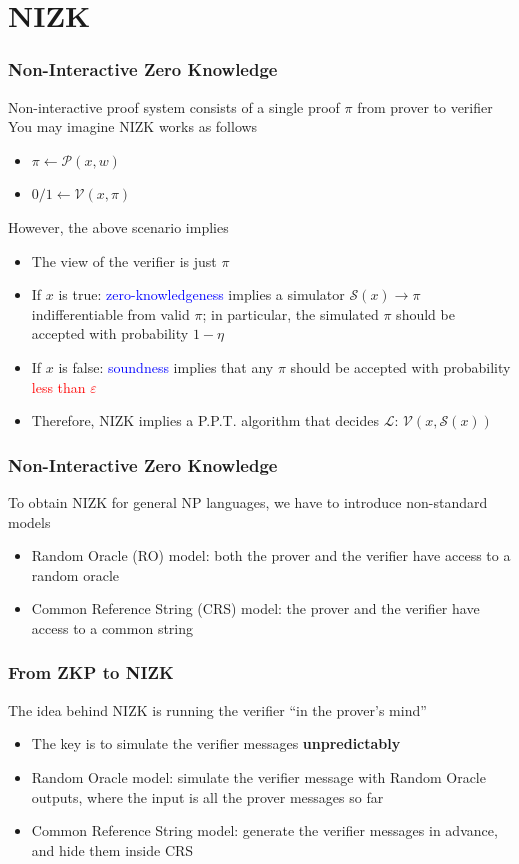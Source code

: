 \documentclass{beamer}
\newcommand{\blue}[1]{\textcolor{blue}{#1}}
\newcommand{\dgreen}[1]{\textcolor{dgreen}{#1}}
\newcommand{\red}[1]{\textcolor{red}{#1}}
\begin{document}
\section{NIZK}

\frame
{
  \frametitle{Non-Interactive Zero Knowledge}
  \onslide<+-> Non-interactive proof system consists of a single proof $\pi$ from prover to verifier\\\vspace{0.3cm}
  \onslide<+-> You may imagine NIZK works as follows
  \begin{itemize}
    \item<+-> $\pi\leftarrow\mathcal{P}(x,w)$
    \item<+-> $0/1\leftarrow\mathcal{V}(x,\pi)$
  \end{itemize}
  \onslide<+-> However, the above scenario implies
  \begin{itemize}
    \item<+-> The view of the verifier is just $\pi$
    \item<+-> If $x$ is true: \blue{zero-knowledgeness} implies a simulator $\mathcal{S}(x)\to\pi$ \dgreen{indifferentiable from valid $\pi$}; in particular, the simulated $\pi$ \dgreen{should be accepted} with probability $1-\eta$
    \item<+-> If $x$ is false: \blue{soundness} implies that any $\pi$ should be accepted with probability \red{less than $\varepsilon$}
    \item<+-> Therefore, NIZK implies a P.P.T. algorithm that decides $\mathcal{L}$: $\mathcal{V}(x,\mathcal{S}(x))$
  \end{itemize}
}


\frame
{
  \frametitle{Non-Interactive Zero Knowledge}
  \onslide<+-> To obtain NIZK for general NP languages, we have to introduce non-standard models
  \begin{itemize}
    \item<+-> Random Oracle (RO) model: both the prover and the verifier have access to a random oracle
    \item<+-> Common Reference String (CRS) model: the prover and the verifier have access to a common string
  \end{itemize}
}

{
  \frametitle{From ZKP to NIZK}

  \onslide<+-> The idea behind NIZK is running the verifier ``in the prover's mind''

  \begin{itemize}
    \item<+-> The key is to simulate the verifier messages \textbf{unpredictably}
    \item<+-> Random Oracle model: simulate the verifier message with Random Oracle outputs, where the input is all the prover messages so far
    \item<+-> Common Reference String model: generate the verifier messages in advance, and hide them inside CRS
  \end{itemize}
}
\end{document}
